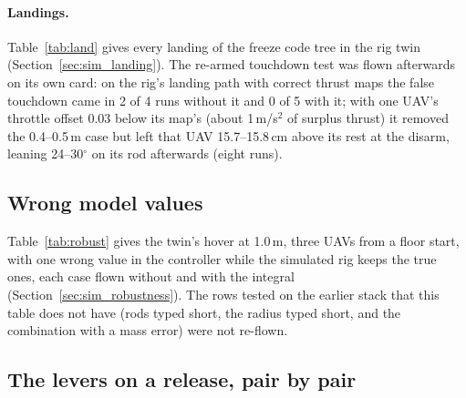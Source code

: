\paragraph{Landings.} Table~\ref{tab:land} gives every landing of the freeze code tree in the rig twin
(Section~\ref{sec:sim_landing}). The re-armed touchdown test was flown afterwards on its own card: on the rig's
landing path with correct thrust maps the false touchdown came in 2 of 4 runs without it and 0 of 5 with it; with one
UAV's throttle offset 0.03 below its map's (about 1\,m/s$^2$ of surplus thrust) it removed the 0.4--0.5\,m case but left that UAV 15.7--15.8\,cm above its rest at the
disarm, leaning 24--30$^\circ$ on its rod afterwards (eight runs).
\begin{table}[h]
\centering
\caption{Every landing of the freeze code tree in the rig twin, from load-down until the fleet is declared landed and
after it.}
\label{tab:land}

\end{table}

\subsection{Wrong model values}
\label{sec:app_robust}

Table~\ref{tab:robust} gives the twin's hover at 1.0\,m, three UAVs from a floor start, with one wrong value in the
controller while the simulated rig keeps the true ones, each case flown without and with the integral
(Section~\ref{sec:sim_robustness}). The rows tested on the earlier stack that this table does not have (rods typed
short, the radius typed short, and the combination with a mass error) were not re-flown.
\begin{table}[htbp]
\centering
\caption[Hover with a wrong model]{Hover at 1.0\,m with one wrong value in the controller's model, rig twin, three
UAVs, $\epsilon = 0$, the measured pull, floor start, freeze code tree. Height error: the mean of two runs over the 15\,s
before LAND. Integral force at LAND: the vertical component. Tilt: mean over the four runs. Landed: flights that
landed without a fault.}
\label{tab:robust}

\end{table}

\subsection{The levers on a release, pair by pair}
\label{sec:app_levers}

